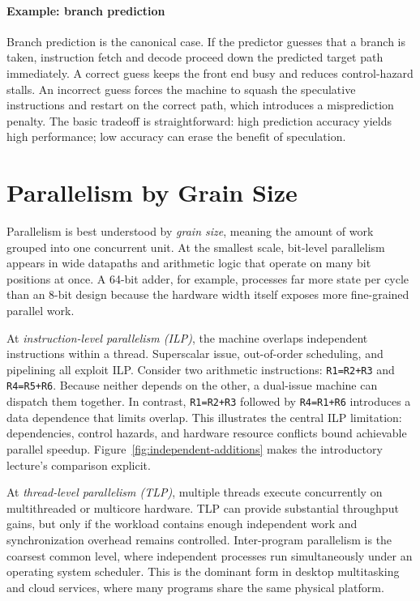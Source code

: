 \paragraph{Example: branch prediction}\label{par:auto-007}
Branch prediction is the canonical case.
If the predictor guesses that a branch is taken, instruction fetch and decode proceed down the predicted target path immediately.
A correct guess keeps the front end busy and reduces control-hazard stalls.
An incorrect guess forces the machine to squash the speculative instructions and restart on the correct path, which introduces a misprediction penalty.
The basic tradeoff is straightforward: high prediction accuracy yields high performance; low accuracy can erase the benefit of speculation.


\section{Parallelism by Grain Size}\label{sec:auto-005}
Parallelism is best understood by \textit{grain size}, meaning the amount of work grouped into one concurrent unit.
At the smallest scale, bit-level parallelism appears in wide datapaths and arithmetic logic that operate on many bit positions at once.
A 64-bit adder, for example, processes far more state per cycle than an 8-bit design because the hardware width itself exposes more fine-grained parallel work.

At \textit{instruction-level parallelism (ILP)}, the machine overlaps independent instructions within a thread.
Superscalar issue, out-of-order scheduling, and pipelining all exploit ILP\@.
Consider two arithmetic instructions: \texttt{R1=R2+R3} and \texttt{R4=R5+R6}.
Because neither depends on the other, a dual-issue machine can dispatch them together.
In contrast, \texttt{R1=R2+R3} followed by \texttt{R4=R1+R6} introduces a data dependence that limits overlap.
This illustrates the central ILP limitation: dependencies, control hazards, and hardware resource conflicts bound achievable parallel speedup.
Figure~\ref{fig:independent-additions} makes the introductory lecture's comparison explicit.


At \textit{thread-level parallelism (TLP)}, multiple threads execute concurrently on multithreaded or multicore hardware.
TLP can provide substantial throughput gains, but only if the workload contains enough independent work and synchronization overhead remains controlled.
Inter-program parallelism is the coarsest common level, where independent processes run simultaneously under an operating system scheduler.
This is the dominant form in desktop multitasking and cloud services, where many programs share the same physical platform.


